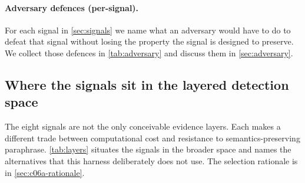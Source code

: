 \documentclass[11pt,letterpaper]{article}
\begin{document}
\paragraph{Adversary defences (per-signal).} For each signal in
\cref{sec:signals} we name what an adversary would have to do to
defeat that signal without losing the property the signal is
designed to preserve. We collect those defences in
\cref{tab:adversary} and discuss them in \cref{sec:adversary}.

\subsection{Where the signals sit in the layered detection space}
\label{sec:layers}

The eight signals are not the only conceivable evidence layers. Each
makes a different trade between computational cost and resistance to
semantics-preserving paraphrase. \cref{tab:layers} situates the
signals in the broader space and names the alternatives that this
harness deliberately does not use. The selection rationale is in
\cref{sec:c06a-rationale}.
\end{document}
